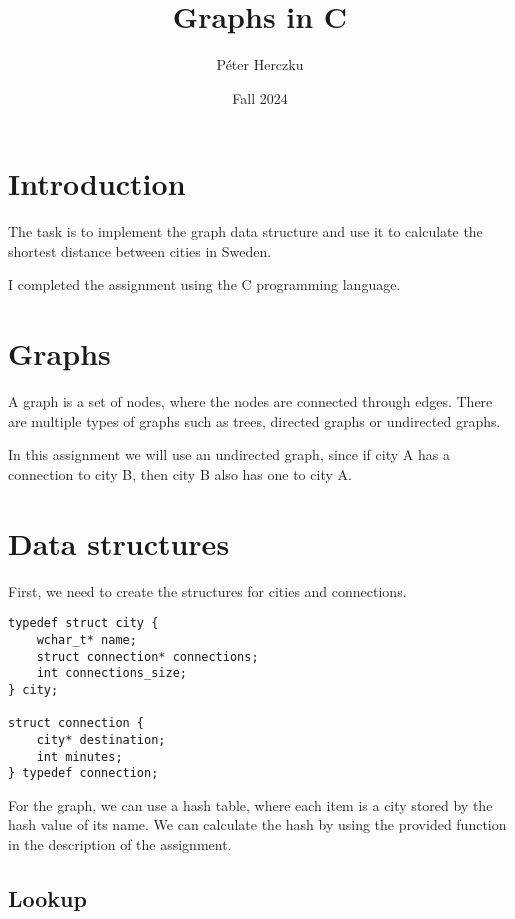 \documentclass[a4paper,11pt]{article}
\begin{document}
    \title{
        \textbf{Graphs in C}
    }
    \author{Péter Herczku}
    \date{Fall 2024}

    \maketitle

    \section*{Introduction}

    The task is to implement the graph data structure and use it to calculate the shortest distance between cities in Sweden.

    I completed the assignment using the C programming language.

    \section*{Graphs}

    A graph is a set of nodes, where the nodes are connected through edges.
    There are multiple types of graphs such as trees, directed graphs or undirected graphs.

    In this assignment we will use an undirected graph, since if city A has a connection to city B, then city B also has one to city A.

    \section*{Data structures}

    First, we need to create the structures for cities and connections.

    \begin{verbatim}
typedef struct city {
    wchar_t* name;
    struct connection* connections;
    int connections_size;
} city;

struct connection {
    city* destination;
    int minutes;
} typedef connection;
    \end{verbatim}

    For the graph, we can use a hash table, where each item is a city stored by the hash value of its name.
    We can calculate the hash by using the provided function in the description of the assignment.

    \subsection*{Lookup}
\end{document}
